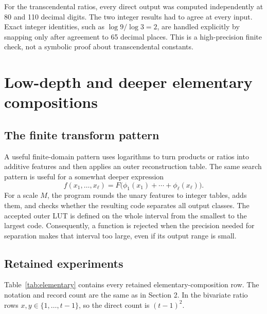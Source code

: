 \documentclass[10pt]{article}
\begin{document}
For the transcendental ratios, every direct output was computed independently at
80 and 110 decimal digits.  The two integer results had to agree at every input.
Exact integer identities, such as \(\log 9/\log 3=2\), are handled explicitly by
snapping only after agreement to 65 decimal places.  This is a high-precision
finite check, not a symbolic proof about transcendental constants.

\section{Low-depth and deeper elementary compositions}

\subsection{The finite transform pattern}

A useful finite-domain pattern uses logarithms to turn products or ratios into
additive features and then applies an outer reconstruction table.  The same
search pattern is useful for a somewhat deeper expression
\[
  f(x_1,\ldots,x_\ell)
  =F\bigl(\phi_1(x_1)+\cdots+\phi_\ell(x_\ell)\bigr).
\]
For a scale \(M\), the program rounds the unary features to integer tables,
adds them, and checks whether the resulting code separates all output classes.
The accepted outer LUT is defined on the whole interval from the smallest to the
largest code.  Consequently, a function is rejected when the precision needed
for separation makes that interval too large, even if its output range is small.

\subsection{Retained experiments}

Table~\ref{tab:elementary} contains every retained elementary-composition row.
The notation and record count are the same as in Section 2.  In the bivariate
ratio rows \(x,y\in\{1,\ldots,t-1\}\), so the direct count is \((t-1)^2\).
\end{document}
